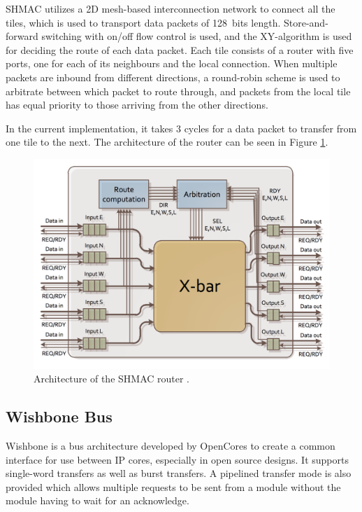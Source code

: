 SHMAC utilizes a 2D mesh-based interconnection network to connect all the tiles, which is used to transport data packets of 128~bits length.
Store-and-forward switching with on/off flow control is used, and the XY-algorithm is used for deciding the route of each data packet.
Each tile consists of a router with five ports, one for each of its neighbours and the local connection.
When multiple packets are inbound from different directions, a round-robin scheme is used to arbitrate between which
packet to route through, and packets from the local tile has equal priority to those arriving from the other directions. \cite{shmac-plan}

In the current implementation, it takes 3 cycles for a data packet to transfer from one tile to the next. 
The architecture of the router can be seen in Figure \ref{fig:shmac-router}.

\begin{figure}[htb]
    \centering
    \includegraphics[width=1.0\textwidth]{Figures/Heterogeneous/SHMACRouter}
    \caption{Architecture of the SHMAC router \cite{shmac-plan}.}
    \label{fig:shmac-router}
\end{figure}

\subsection{Wishbone Bus}

Wishbone is a bus architecture developed by OpenCores to create a common interface for use between IP cores, especially in
open source designs. It supports single-word transfers as well as burst transfers. A pipelined transfer mode is also provided
which allows multiple requests to be sent from a module without the module having to wait for an acknowledge.

